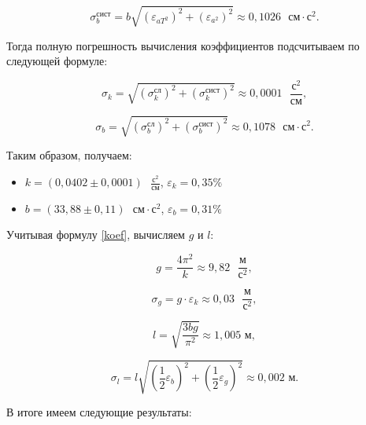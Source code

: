 \documentclass[a4paper,12pt]{article} %
\begin{document}
\begin{equation}
\sigma^\text{сист}_b = b\sqrt{\left( \varepsilon_{aT^2} \right)^2 + \left( \varepsilon_{a^2} \right)^2 } \approx  0,1026 \text{ }\text{см}\cdot\text{с}^2.
\end{equation}

Тогда полную погрешность вычисления коэффициентов подсчитываем по следующей формуле:

\begin{equation}
\sigma_k = \sqrt{\left( \sigma_k^\text{сл} \right)^2 + \left( \sigma_k^\text{сист} \right)^2 } \approx 0,0001 \text{ }\frac{\text{с}^2}{\text{см}},
\end{equation}

\begin{equation}
\sigma_b = \sqrt{\left( \sigma_b^\text{сл} \right)^2 + \left( \sigma_b^\text{сист} \right)^2 } \approx 0,1078 \text{ }\text{см}\cdot\text{с}^2.
\end{equation}

Таким образом, получаем:
\begin{itemize}
	\item $ k = \left( 0,0402\pm0,0001\right)  \text{ }\frac{\text{с}^2}{\text{см}} $, $ \varepsilon_k = 0,35 \% $
	\item $ b = \left( 33,88\pm0,11\right)  \text{ }\text{см}\cdot\text{с}^2 $, $ \varepsilon_b = 0,31 \% $
\end{itemize}

Учитывая формулу \eqref{koef}, вычисляем $ g $ и $ l $:

\begin{equation}
g = \frac{4\pi^2}{k} \approx 9,82 \text{ }\frac{\text{м}}{\text{с}^2},
\end{equation}

\begin{equation}
\sigma_g = g\cdot\varepsilon_k \approx 0,03 \text{ }\frac{\text{м}}{\text{с}^2},
\end{equation}

\begin{equation}
l=\sqrt{\frac{3bg}{\pi^2}}\approx 1,005 \text{ м},
\end{equation}

\begin{equation}
\sigma_l = l\sqrt{\left( \frac{1}{2}\varepsilon_b \right)^2 + \left( \frac{1}{2}\varepsilon_g \right)^2 }\approx 0,002 \text{ м}.
\end{equation}

В итоге имеем следующие результаты:
\end{document}
